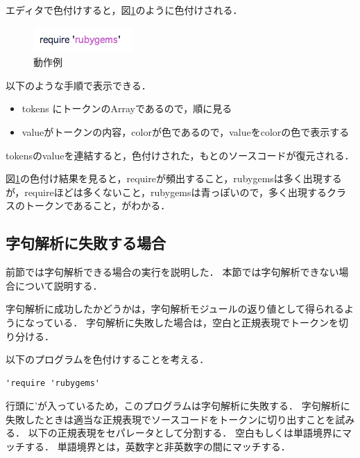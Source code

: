\documentclass{cs-thesis}
\begin{document}
エディタで色付けすると，図\ref{example-code-can-compile}のように色付けされる．

  \begin{figure}[htbp]
   \centering
   \includegraphics[scale=0.8]{example-code-can-compile.png}
   \caption{動作例}
   \label{example-code-can-compile}
  \end{figure}


  以下のような手順で表示できる．

\begin{itemize}
 \item tokens にトークンのArrayであるので，順に見る
 \item valueがトークンの内容，colorが色であるので，valueをcolorの色で表示する
\end{itemize}

tokensのvalueを連結すると，色付けされた，もとのソースコードが復元される．

  図\ref{example-code-can-compile}の色付け結果を見ると，requireが頻出すること，rubygemsは多く出現するが，requireほどは多くないこと，rubygemsは青っぽいので，多く出現するクラスのトークンであること，がわかる．

  \subsection{字句解析に失敗する場合}

  前節では字句解析できる場合の実行を説明した．
  本節では字句解析できない場合について説明する．

  字句解析に成功したかどうかは，字句解析モジュールの返り値として得られるようになっている．
  字句解析に失敗した場合は，空白と正規表現でトークンを切り分ける．

  以下のプログラムを色付けすることを考える．

\begin{framed}
\begin{verbatim}
'require 'rubygems'
\end{verbatim}
\end{framed}

行頭に'が入っているため，このプログラムは字句解析に失敗する．
字句解析に失敗したときは適当な正規表現でソースコードをトークンに切り出すことを試みる．
以下の正規表現をセパレータとして分割する．
空白もしくは単語境界にマッチする．
単語境界とは，英数字と非英数字の間にマッチする．
\end{document}
